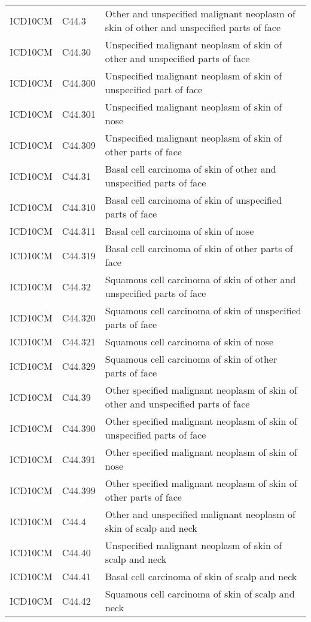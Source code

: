 \begin{table}[ht]
\begin{tabular}{lll}
  ICD10CM & C44.3 & Other and unspecified malignant neoplasm of skin of other and unspecified parts of face \\ 
  ICD10CM & C44.30 & Unspecified malignant neoplasm of skin of other and unspecified parts of face \\ 
  ICD10CM & C44.300 & Unspecified malignant neoplasm of skin of unspecified part of face \\ 
  ICD10CM & C44.301 & Unspecified malignant neoplasm of skin of nose \\ 
  ICD10CM & C44.309 & Unspecified malignant neoplasm of skin of other parts of face \\ 
  ICD10CM & C44.31 & Basal cell carcinoma of skin of other and unspecified parts of face \\ 
  ICD10CM & C44.310 & Basal cell carcinoma of skin of unspecified parts of face \\ 
  ICD10CM & C44.311 & Basal cell carcinoma of skin of nose \\ 
  ICD10CM & C44.319 & Basal cell carcinoma of skin of other parts of face \\ 
  ICD10CM & C44.32 & Squamous cell carcinoma of skin of other and unspecified parts of face \\ 
  ICD10CM & C44.320 & Squamous cell carcinoma of skin of unspecified parts of face \\ 
  ICD10CM & C44.321 & Squamous cell carcinoma of skin of nose \\ 
  ICD10CM & C44.329 & Squamous cell carcinoma of skin of other parts of face \\ 
  ICD10CM & C44.39 & Other specified malignant neoplasm of skin of other and unspecified parts of face \\ 
  ICD10CM & C44.390 & Other specified malignant neoplasm of skin of unspecified parts of face \\ 
  ICD10CM & C44.391 & Other specified malignant neoplasm of skin of nose \\ 
  ICD10CM & C44.399 & Other specified malignant neoplasm of skin of other parts of face \\ 
  ICD10CM & C44.4 & Other and unspecified malignant neoplasm of skin of scalp and neck \\ 
  ICD10CM & C44.40 & Unspecified malignant neoplasm of skin of scalp and neck \\ 
  ICD10CM & C44.41 & Basal cell carcinoma of skin of scalp and neck \\ 
  ICD10CM & C44.42 & Squamous cell carcinoma of skin of scalp and neck \\ 

\end{tabular}
\end{table}
